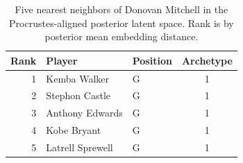 \begin{table}[htbp]
  \centering\small
  \begin{tabular}{rllc}
    \toprule
    Rank & Player & Position & Archetype \\
    \midrule
    1 & Kemba Walker & G & 1 \\
    2 & Stephon Castle & G & 1 \\
    3 & Anthony Edwards & G & 1 \\
    4 & Kobe Bryant & G & 1 \\
    5 & Latrell Sprewell & G & 1 \\
    \bottomrule
  \end{tabular}
  \caption{Five nearest neighbors of Donovan Mitchell in the Procrustes-aligned posterior latent space. Rank is by posterior mean embedding distance.}
  \label{tab:Donovan_Mitchell_neighbors}
\end{table}

